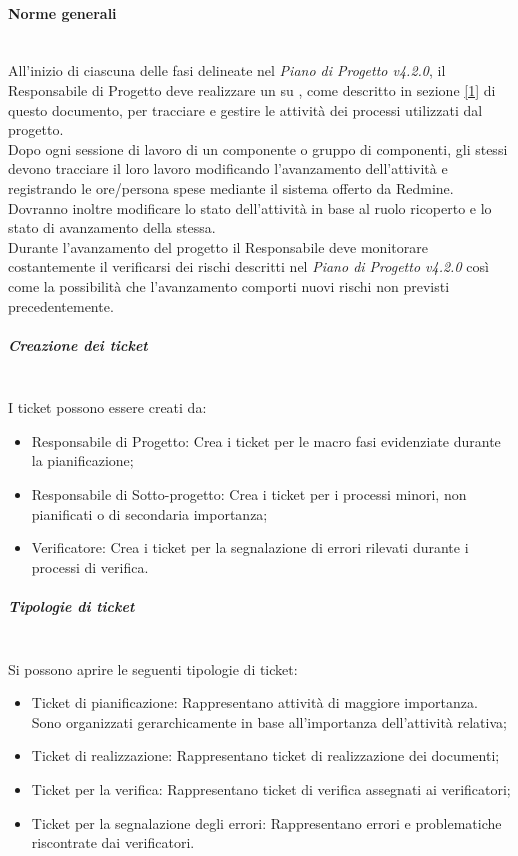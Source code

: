 \paragraph{Norme generali} \hfill \\
All'inizio di ciascuna delle fasi delineate nel \emph{Piano di Progetto v4.2.0}, il Responsabile di Progetto deve realizzare un  su , come descritto in sezione \ref{1} di questo documento, per tracciare e gestire le attivit\`{a} dei processi utilizzati dal progetto.\\
Dopo ogni sessione di lavoro di un componente o gruppo di componenti, gli stessi devono tracciare il loro lavoro modificando l'avanzamento dell'attivit\`{a} e registrando le ore/persona spese mediante il sistema offerto da Redmine.
Dovranno inoltre modificare lo stato dell'attivit\`{a} in base al ruolo ricoperto e lo stato di avanzamento della stessa.\\
Durante l'avanzamento del progetto il Responsabile  deve monitorare costantemente il verificarsi dei rischi descritti nel \emph{Piano di Progetto v4.2.0} così come la possibilità che l'avanzamento comporti nuovi rischi non previsti precedentemente.

\subparagraph{Creazione dei ticket} \hfill \\
I ticket possono essere creati da:
\begin{itemize}
\item Responsabile di Progetto: Crea i ticket per le macro fasi evidenziate durante la pianificazione;
\item Responsabile di Sotto-progetto: Crea i ticket per i processi minori, non pianificati o di secondaria importanza;
\item Verificatore: Crea i ticket per la segnalazione di errori rilevati durante i processi di verifica.
\end{itemize}

\subparagraph{Tipologie di ticket} \hfill \\

Si possono aprire le seguenti tipologie di ticket:
\begin{itemize}
\item Ticket di pianificazione: Rappresentano attivit\`{a} di maggiore importanza. Sono organizzati gerarchicamente in base all'importanza dell'attivit\`{a} relativa;
\item Ticket di realizzazione: Rappresentano ticket di realizzazione dei documenti;
\item Ticket per la verifica: Rappresentano ticket di verifica assegnati ai verificatori;
\item Ticket per la segnalazione degli errori: Rappresentano errori e problematiche riscontrate dai verificatori.

\end{itemize}

